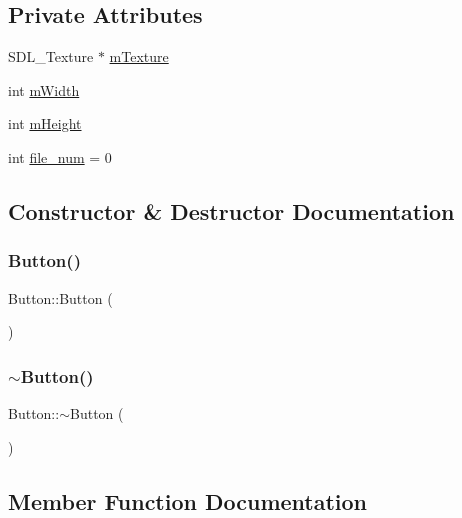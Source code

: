 \subsection*{Private Attributes}
\begin{DoxyCompactItemize}
\item 
S\+D\+L\+\_\+\+Texture $\ast$ \mbox{\hyperlink{class_button_ac5e57d9ffee5d8bae504d008562c1951}{m\+Texture}}
\item 
int \mbox{\hyperlink{class_button_a64b130b0efe8346077d12856bd2b1a93}{m\+Width}}
\item 
int \mbox{\hyperlink{class_button_a16e3433e25036f17d11ce38b178596bd}{m\+Height}}
\item 
int \mbox{\hyperlink{class_button_acbdc1b6ff9b8651ed0bcfaae9fe74610}{file\+\_\+num}} = 0
\end{DoxyCompactItemize}


\subsection{Constructor \& Destructor Documentation}
\mbox{\label{class_button_a3b36df1ae23c58aedb9e15a713159459}} 
\subsubsection{\texorpdfstring{Button()}{Button()}}
{\footnotesize\ttfamily Button\+::\+Button (\begin{DoxyParamCaption}{ }\end{DoxyParamCaption})}

\mbox{\label{class_button_a2a001eb9c3cc8ae54768a850dd345002}} 
\subsubsection{\texorpdfstring{$\sim$\+Button()}{~Button()}}
{\footnotesize\ttfamily Button\+::$\sim$\+Button (\begin{DoxyParamCaption}{ }\end{DoxyParamCaption})}



\subsection{Member Function Documentation}
\mbox{\label{class_button_ab31b0993b959cf9863eb2cf22a7ae18b}} 
